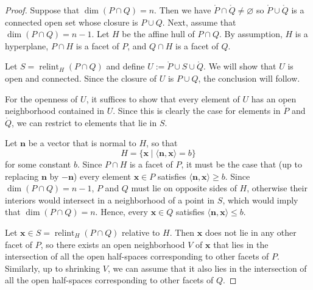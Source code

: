 \documentclass[10pt]{article}
\newtheorem{lemma}[theorem]{Lemma}
\theoremstyle{definition}
\theoremstyle{remark}
\renewcommand{\vec}[1]{\mathbf{#1}}
\def\vn{{\bm{n}}}
\def\vx{{\vec{x}}}
\begin{document}

\begin{proof}
    Suppose that $\dim (P \cap Q) = n$. Then we have $\mathring P \cap \mathring Q \ne \varnothing$ so $\mathring P \cup \mathring Q$ is a connected open set whose closure is $P \cup Q$. Next, assume that $\dim (P \cap Q) = n-1$. 
    Let $H$ be the affine hull of $P \cap Q$. By assumption, $H$ is a hyperplane, $P \cap H$ is a facet of $P$, and $Q \cap H$ is a facet of $Q$.

    Let $S = \operatorname{relint}_H(P \cap Q)$ and define $U := \mathring{P} \cup S \cup \mathring{Q}$. We will show that $U$ is open and connected. Since the closure of $U$ is $P \cup Q$, the conclusion will follow. 

    For the openness of $U$, it suffices to show that every element of $U$ has an open neighborhood contained in $U$. Since this is clearly the case for elements in $\mathring P$ and $\mathring Q$, we can restrict to elements that lie in $S$.

    Let $\vn$ be a vector that is normal to $H$, so that 
    $$
    H = \{ \vx \mid \langle \vn, \vx \rangle = b\} 
    $$
    for some constant $b$.
    Since $P \cap H$ is a facet of $P$, it must be the case that (up to replacing $\vn$ by $-\vn$) every element $\vx \in P$ satisfies $\langle \vn, \vx \rangle \ge b$. Since $\dim(P \cap Q) = n - 1$, $P$ and $Q$ must lie on opposite sides of $H$, otherwise their interiors would intersect in a neighborhood of a point in $S$, which would imply that $\dim(P \cap Q) = n$. Hence, every $\vx \in Q$ satisfies $\langle \vn, \vx \rangle \le b$.

    Let $\vx \in S = \operatorname{relint}_H(P \cap Q)$ relative to $H$. Then $\vx$ does not lie in any other facet of $P$, so there exists an open neighborhood $V$ of $\vx$ that lies in the intersection of all the open half-spaces corresponding to other facets of $P$. Similarly, up to shrinking $V$, we can assume that it also lies in the intersection of all the open half-spaces corresponding to other facets of $Q$.


\end{proof}
\end{document}

